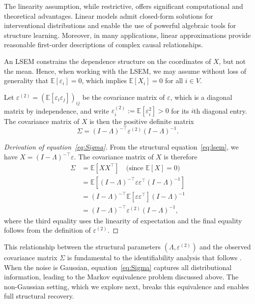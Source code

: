 \documentclass[11pt,a4paper]{article}
\numberwithin{equation}{section}
\begin{document}
The linearity assumption, while restrictive, offers significant computational and theoretical advantages. Linear models admit closed-form solutions for interventional distributions and enable the use of powerful algebraic tools for structure learning. Moreover, in many applications, linear approximations provide reasonable first-order descriptions of complex causal relationships.

An LSEM constrains the dependence structure on the coordinates of $X$, but not the mean. Hence, when working with the LSEM, we may assume without loss of generality that $\mathbb{E}[\varepsilon_i] = 0$, which implies $\mathbb{E}[X_i] = 0$ for all $i \in V$.

Let $\varepsilon^{(2)} = (\mathbb{E}[\varepsilon_i \varepsilon_j])_{ij}$ be the covariance matrix of $\varepsilon$, which is a diagonal matrix by independence, and write $\varepsilon^{(2)}_i := \mathbb{E}[\varepsilon_i^2] > 0$ for its $i$th diagonal entry. The covariance matrix of $X$ is then the positive definite matrix
\begin{equation}
\label{eq:Sigma}
\Sigma = (I - \Lambda)^{-\top} \varepsilon^{(2)} (I - \Lambda)^{-1}.
\end{equation}

\begin{proof}[Derivation of equation~\eqref{eq:Sigma}]
From the structural equation~\eqref{eq:lsem}, we have $X = (I - \Lambda)^{-\top} \varepsilon$. The covariance matrix of $X$ is therefore
\begin{align}
\Sigma &= \mathbb{E}[XX^{\top}] \quad \text{(since $\mathbb{E}[X] = 0$)} \\
&= \mathbb{E}\left[(I - \Lambda)^{-\top} \varepsilon \varepsilon^{\top} (I - \Lambda)^{-1}\right] \\
&= (I - \Lambda)^{-\top} \mathbb{E}[\varepsilon \varepsilon^{\top}] (I - \Lambda)^{-1} \\
&= (I - \Lambda)^{-\top} \varepsilon^{(2)} (I - \Lambda)^{-1},
\end{align}
where the third equality uses the linearity of expectation and the final equality follows from the definition of $\varepsilon^{(2)}$.
\end{proof}

This relationship between the structural parameters $(\Lambda, \varepsilon^{(2)})$ and the observed covariance matrix $\Sigma$ is fundamental to the identifiability analysis that follows \citep[see, e.g.,][]{tramontano:monod:drton:2022}. When the noise is Gaussian, equation~\eqref{eq:Sigma} captures all distributional information, leading to the Markov equivalence problem discussed above. The non-Gaussian setting, which we explore next, breaks this equivalence and enables full structural recovery.
\end{document}
